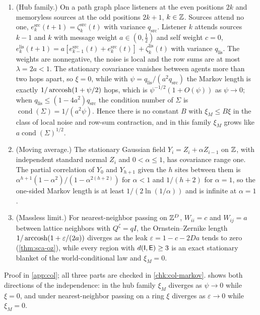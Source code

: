 \begin{proposition}\label{prop:col-markov-vs-correlation}
\begin{enumerate}
\item[(a)] (Hub family.) On a path graph place listeners at the even positions $2k$ and memoryless sources at the odd positions $2k+1$, $k\in\mathbb{Z}$. Sources attend no one, $e^{\mathrm{src}}_k(t+1)=\zeta^{\mathrm{src}}_k(t)$ with variance $q_{\mathrm{src}}$. Listener $k$ attends sources $k-1$ and $k$ with message weight $a\in(0,\frac12)$ and self weight $c=0$, $e^{\mathrm{lis}}_k(t+1)=a[e^{\mathrm{src}}_{k-1}(t)+e^{\mathrm{src}}_k(t)]+\zeta^{\mathrm{lis}}_k(t)$ with variance $q_{\mathrm{lis}}$. The weights are nonnegative, the noise is local and the row sums are at most $\lambda=2a<1$. The stationary covariance vanishes between agents more than two hops apart, so $\xi=0$, while with $\psi=q_{\mathrm{lis}}/(a^2q_{\mathrm{src}})$ the Markov length is exactly $1/\operatorname{arccosh}(1+\psi/2)$ hops, which is $\psi^{-1/2}(1+O(\psi))$ as $\psi\to0$; when $q_{\mathrm{lis}}\le(1-4a^2)q_{\mathrm{src}}$ the condition number of $\Sigma$ is $\operatorname{cond}(\Sigma)=1/(a^2\psi)$. Hence there is no constant $B$ with $\xi_M\le B\xi$ in the class of local noise and row-sum contraction, and in this family $\xi_M$ grows like $a\operatorname{cond}(\Sigma)^{1/2}$.
\item[(b)] (Moving average.) The stationary Gaussian field $Y_i=Z_i+\alpha Z_{i-1}$ on $\mathbb{Z}$, with independent standard normal $Z_i$ and $0<\alpha\le1$, has covariance range one. The partial correlation of $Y_0$ and $Y_{h+1}$ given the $h$ sites between them is $\alpha^{h+1}(1-\alpha^2)/(1-\alpha^{2(h+2)})$ for $\alpha<1$ and $1/(h+2)$ for $\alpha=1$, so the one-sided Markov length is at least $1/(2\ln(1/\alpha))$ and is infinite at $\alpha=1$.
\item[(c)] (Massless limit.) For nearest-neighbor passing on $\mathbb{Z}^D$, $W_{ii}=c$ and $W_{ij}=a$ between lattice neighbors with $Q^{\zeta}=qI$, the Ornstein--Zernike length $1/\operatorname{arccosh}(1+\varepsilon/(2a))$ diverges as the leak $\varepsilon=1-c-2Da$ tends to zero (\cref{thm:sca-oz}), while every region with $d(\mathsf{I},\mathsf{E})\ge3$ is an exact stationary blanket of the world-conditional law and $\xi_M=0$.
\end{enumerate}
\end{proposition}
Proof in \cref{app:col}; all three parts are checked in \cref{chk:col-markov}.  shows both directions of the independence: in the hub family $\xi_M$ diverges as $\psi\to0$ while $\xi=0$, and under nearest-neighbor passing on a ring $\xi$ diverges as $\varepsilon\to0$ while $\xi_M=0$.

